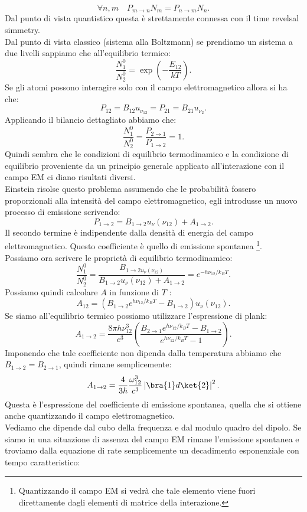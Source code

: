 \[
\forall n,m \quad P_{m\to n}N_m = P_{n\to m}N_n 
.\] 
Dal punto di vista quantistico questa è strettamente connessa con il time revelsal simmetry.\\
Dal punto di vista classico (sistema alla Boltzmann) se prendiamo un sistema a due livelli sappiamo che all'equilibrio termico:
\[
    \frac{N_1^0}{N_2^0}= \exp\left(-\frac{E_{12}}{kT}\right)
.\] 
Se gli atomi possono interagire solo con il campo elettromagnetico allora si ha che:
\[
P_{12} = B_{12}u_{\nu_{12}}=P_{21}=B_{21}u_{\nu_2}
.\] 
Applicando il bilancio dettagliato abbiamo che:
\[
\frac{N_1^0}{N_2^0} = \frac{P_{2\to 1}}{P_{1\to 2}} = 1
.\] 
Quindi sembra che le condizioni di equilibrio termodinamico e la condizione di equilibrio proveniente da un principio generale applicato all'interazione con il campo EM ci diano risultati diversi. \\
Einstein risolse questo problema assumendo che le probabilità fossero proporzionali alla intensità del campo elettromagnetico, egli introdusse un nuovo processo di emissione scrivendo:
\[
    P_{1\to 2}= B_{1\to 2}u_{\nu}(\nu_{12})  + A_{1\to 2}
.\] 
Il secondo termine è indipendente dalla densità di energia del campo elettromagnetico. Questo coefficiente è quello di emissione spontanea \footnote{Quantizzando il campo EM si vedrà che tale elemento viene fuori direttamente dagli elementi di matrice della interazione.}.\\
Possiamo ora scrivere le proprietà di equilibrio termodinamico:
\[
    \frac{N_1^0}{N_2^0} = \frac{B_{1\to 2 u_\nu(\nu_{12})}}{B_{1\to 2}u_\nu(\nu_{12}) + A_{1\to 2}} = e^{-h\nu_{12} /k_BT}
.\] 
Possiamo quindi calcolare $A$  in funzione di $T$  :
\[
    A_{12} = \left(B_{1\to 2}e^{h\nu_{12} /k_BT}-B_{1\to 2}\right)u_\nu(\nu_{12}) 
.\] 
Se siamo all'equilibrio termico possiamo utilizzare l'espressione di plank:
\[
A_{1\to 2} =
\frac{8\pi h\nu_{12}^3}{c^3}\left(\frac{B_{2\to 1}e^{h\nu_{12} /k_BT}-B_{1\to 2}}{e^{h\nu_{12} /k_BT}-1}\right)
.\] 
Imponendo che tale coefficiente non dipenda dalla temperatura abbiamo che $B_{1\to 2}=B_{2\to 1}$, quindi rimane semplicemente:
\[
A_{1\to 2}=\frac{4}{3\hbar }\frac{\omega_{12}^3}{c ^3}\left|\bra{1}d\ket{2}\right|^2
.\] 
Questa è l'espressione del coefficiente di emissione spontanea, quella che si ottiene anche quantizzando il campo elettromagnetico.\\
Vediamo che dipende dal cubo della frequenza e dal modulo quadro del dipolo. Se siamo in una situazione di assenza del campo EM rimane l'emissione spontanea e troviamo dalla equazione di rate semplicemente un decadimento esponenziale con tempo caratteristico:
